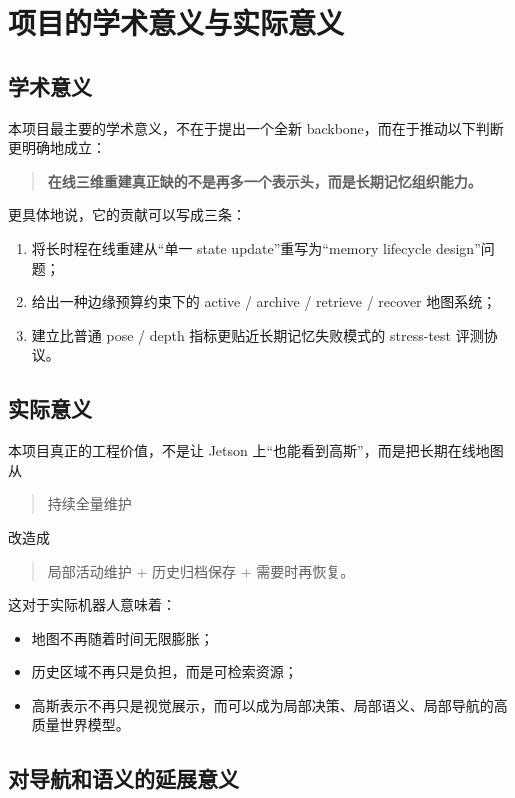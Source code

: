 \documentclass[12pt]{article}
\begin{document}
\section{项目的学术意义与实际意义}

\subsection{学术意义}

本项目最主要的学术意义，不在于提出一个全新 backbone，而在于推动以下判断更明确地成立：
\begin{quote}
\textbf{在线三维重建真正缺的不是再多一个表示头，而是长期记忆组织能力。}
\end{quote}

更具体地说，它的贡献可以写成三条：
\begin{enumerate}
  \item 将长时程在线重建从“单一 state update”重写为“memory lifecycle design”问题；
  \item 给出一种边缘预算约束下的 active / archive / retrieve / recover 地图系统；
  \item 建立比普通 pose / depth 指标更贴近长期记忆失败模式的 stress-test 评测协议。
\end{enumerate}

\subsection{实际意义}

本项目真正的工程价值，不是让 Jetson 上“也能看到高斯”，而是把长期在线地图从
\begin{quote}
持续全量维护
\end{quote}
改造成
\begin{quote}
局部活动维护 + 历史归档保存 + 需要时再恢复。
\end{quote}

这对于实际机器人意味着：
\begin{itemize}
  \item 地图不再随着时间无限膨胀；
  \item 历史区域不再只是负担，而是可检索资源；
  \item 高斯表示不再只是视觉展示，而可以成为局部决策、局部语义、局部导航的高质量世界模型。
\end{itemize}

\subsection{对导航和语义的延展意义}
\end{document}
